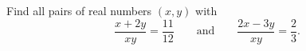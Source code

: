 Find all pairs of real numbers $(x,y)$ with
\[\dfrac{x+2y}{xy}=\dfrac{11}{12}\qquad\text{and}\qquad\dfrac{2x-3y}{xy}=\dfrac{2}{3}.\]
